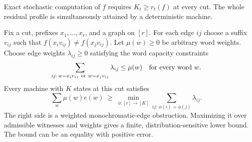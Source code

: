 \begin{theorem}
\label{thm:v20-weighted}
Exact stochastic computation of $f$ requires $K_t\ge r_t(f)$ at every
cut. The whole residual profile is simultaneously attained by a
deterministic machine.

Fix a cut, prefixes $x_1,\ldots,x_r$, and a graph on $[r]$. For each
edge $ij$ choose a suffix $v_{ij}$ such that
$f(x_iv_{ij})\ne f(x_jv_{ij})$. Let $\mu(w)\ge0$ be arbitrary word
weights. Choose edge weights $\lambda_{ij}\ge0$ satisfying the word
capacity constraints
\begin{equation}\label{eq:v20-congestion}
 \sum_{ij:\,w=x_iv_{ij}\ \text{or}\ w=x_jv_{ij}}\lambda_{ij}
 \le\mu(w)\quad\hbox{for every word }w.
\end{equation}
Every machine with $K$ states at this cut satisfies
\begin{equation}\label{eq:v20-graph}
 \sum_w\mu(w)e(w)\ \ge\
 \min_{\phi:[r]\to[K]}
       \sum_{ij:\,\phi(i)=\phi(j)}\lambda_{ij}.
\end{equation}
The right side is a weighted monochromatic-edge obstruction. Maximizing
it over admissible witnesses and weights gives a finite,
distribution-sensitive lower bound. The bound can be an equality with
positive error.
\end{theorem}
